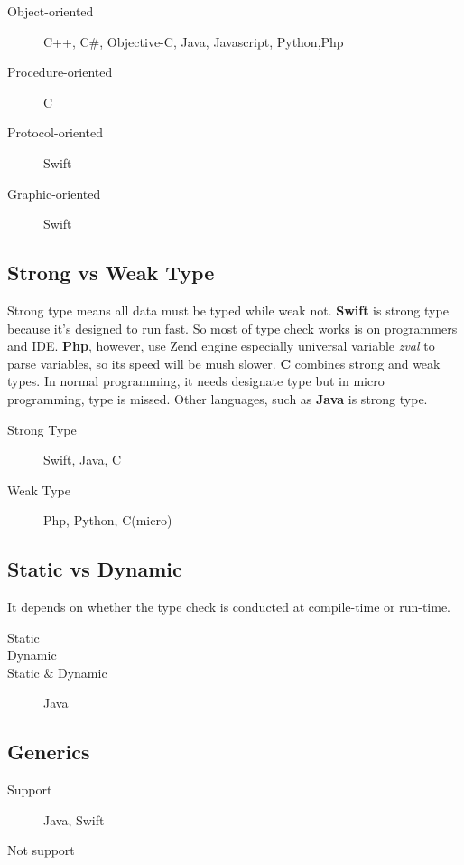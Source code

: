 \documentclass[12pt, a4pape]{article}
\begin{document}
	\begin{description}
		\item[Object-oriented] C++, C\#, Objective-C, Java, Javascript, Python,Php
		\item[Procedure-oriented] C
		\item[Protocol-oriented] Swift
		\item[Graphic-oriented] Swift
	\end{description}
	
	\subsection{Strong vs Weak Type}
	Strong type means all data must be typed while weak not.
	\textbf{Swift} is strong type because it's designed to run fast. So most of type check works is on programmers and IDE. \textbf{Php},  however, use Zend engine especially universal variable \emph{zval} to parse variables, so its speed will be mush slower. \textbf{C} combines strong and weak types. In normal programming, it needs designate type but in micro programming, type is missed. Other languages, such as \textbf{Java} is strong type.
	\begin{description}
		\item[Strong Type] Swift, Java, C
		\item[Weak Type] Php, Python, C(micro)
	\end{description}
	
	
	\subsection{Static vs Dynamic}
	It depends on whether the type check is conducted at compile-time or run-time. 
	\begin{description}
		\item[Static]
		\item[Dynamic]
		\item[Static \& Dynamic] Java
	\end{description}
	
	
	\subsection{Generics}
	\begin{description}
		\item[Support] Java, Swift
		\item[Not support]
	\end{description}
		
\end{document}

